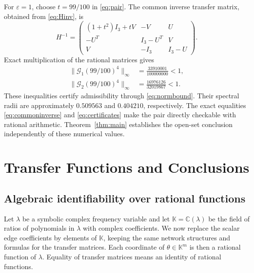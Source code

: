 \documentclass[letterpaper,10pt,conference]{ieeeconf}
\newcommand{\aicite}{\texorpdfstring{\protect\cite{codex}}{}}
\begin{document}
For \(\varepsilon=1\), choose \(t=99/100\) in \eqref{eq:pair}.
The common inverse transfer matrix, obtained from \eqref{eq:Hinv}, is
\begin{equation}\label{eq:commoninverse}
 H^{-1}=
 \begin{pmatrix}
 (1+t^2)I_3+tV&-V&U\\
 -U^T&I_3-U^T&V\\
 V&-I_3&I_3-U
 \end{pmatrix}.
\end{equation}
Exact multiplication of the rational matrices gives
\begin{equation}\label{eq:certificates}
\begin{split}
 \|\mathcal G_1(99/100)^4\|_\infty
     &=\frac{33910001}{100000000}<1,\\
 \|\mathcal G_2(99/100)^4\|_\infty
     &=\frac{16976126}{32019867}<1.
\end{split}
\end{equation}
These inequalities certify admissibility through \eqref{eq:normbound}.
Their spectral radii are approximately \(0.509563\) and \(0.404210\),
respectively. The exact equalities \eqref{eq:commoninverse} and
\eqref{eq:certificates} make the pair directly checkable with rational
arithmetic. Theorem~\ref{thm:main} establishes the open-set conclusion
independently of these numerical values.

\section{Transfer Functions and Conclusions \aicite}
\label{sec:conclusion}

\subsection{Algebraic identifiability over rational functions}

Let \(\lambda\) be a symbolic complex frequency variable and let
\(\mathbb K=\mathbb C(\lambda)\) be the field of ratios of polynomials
in \(\lambda\) with complex coefficients. We now replace the scalar
edge coefficients by elements of \(\mathbb K\), keeping the same
network structures and formulas for the transfer matrices. Each coordinate of
\(\theta\in\mathbb K^m\) is then a rational function of \(\lambda\).
Equality of transfer matrices means an identity of rational functions.
\end{document}
